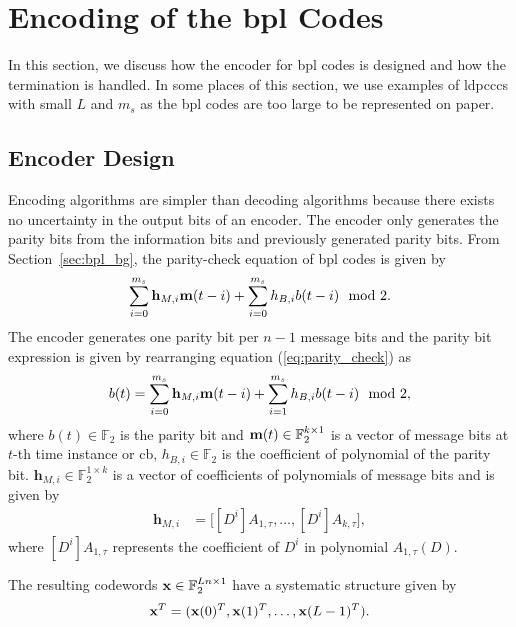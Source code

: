 \section{Encoding of the \acl{bpl} Codes}\label{ch:encode}
In this section, we discuss how the encoder for \ac{bpl} codes is designed and how the termination is handled. In some places of this section, we use examples of \acp{ldpccc} with small $L$ and $m_s$ as the \ac{bpl} codes are too large to be represented on paper.

\subsection{Encoder Design}\label{sec:enc_design}
Encoding algorithms are simpler than decoding algorithms because there exists no uncertainty in the output bits of an encoder. The encoder only generates the parity bits from the information bits and previously generated parity bits. From Section~\ref{sec:bpl_bg}, the parity-check equation of \ac{bpl} codes is given by
\begin{align}\label{eq:parity_check}
\sum_{i=0}^{m_s}\mathbf{h}_{M,i}\mathbf{m}(t-i)+\sum_{i=0}^{m_s}h_{B,i}b(t-i) \mod 2.
\end{align}
The encoder generates one parity bit per $n-1$ message bits and the parity bit expression is given by rearranging equation (\ref{eq:parity_check}) as
\begin{align}\label{eq:parity_bit}
b(t)=\sum_{i=0}^{m_s}\mathbf{h}_{M,i}\mathbf{m}(t-i)+\sum_{i=1}^{m_s}h_{B,i}b(t-i) \mod 2,
\end{align}
where $b(t)\in\mathbb{F}_2$ is the parity bit and $\mathbf{m}(t)\in\mathbb{F}_2^{k\times 1}$ is a vector of message bits at $t$-th time instance or \ac{cb}, $h_{B,i}\in\mathbb{F}_2$ is the coefficient of polynomial of the parity bit. $\mathbf{h}_{M,i}\in\mathbb{F}_2^{1\times k}$ is a vector of coefficients of polynomials of message bits and is given by
\begin{align}
\mathbf{h}_{M,i}&= \big[[D^i]A_{1,\tau},\dots,[D^i]A_{k,\tau}\big],
\end{align}
where $[D^i]A_{1,\tau}$ represents the coefficient of $D^i$ in polynomial $A_{1,\tau}(D)$.

The resulting codewords $\mathbf{x}\in\mathbb{F}_2^{Ln\times 1}$ have a systematic structure given by \begin{align}\mathbf{x}^T=(\mathbf{x}(0)^T,\mathbf{x}(1)^T,\dots,\mathbf{x}(L-1)^T).\end{align}

